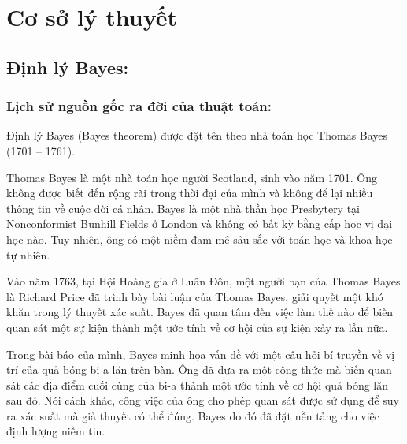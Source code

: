 \setlength{\headheight}{14.93912pt}  %
\addtolength{\topmargin}{-2.93912pt} %

\pagestyle{fancy} 

\fancyhf{}  %

\fancyfoot[C]{\thepage}  %

\chapter[Cơ sở lý thuyết]{\centering Cơ sở lý thuyết}

\section{Định lý Bayes:}

\subsection{Lịch sử nguồn gốc ra đời của thuật toán:}

Định lý Bayes (Bayes theorem) được đặt tên theo nhà toán học Thomas Bayes (1701 – 1761).

Thomas Bayes là một nhà toán học người Scotland, sinh vào năm 1701. Ông không được biết đến rộng rãi trong thời đại của mình và không để lại nhiều thông tin về cuộc đời cá nhân. Bayes là một nhà thần học Presbytery tại Nonconformist Bunhill Fields ở London và không có bất kỳ bằng cấp học vị đại học nào. Tuy nhiên, ông có một niềm đam mê sâu sắc với toán học và khoa học tự nhiên.

Vào năm 1763, tại Hội Hoàng gia ở Luân Đôn, một người bạn của Thomas Bayes là Richard Price đã trình bày bài luận của Thomas Bayes, giải quyết một khó khăn trong lý thuyết xác suất. Bayes đã quan tâm đến việc làm thế nào để biến quan sát một sự kiện thành một ước tính về cơ hội của sự kiện xảy ra lần nữa.

Trong bài báo của mình, Bayes minh họa vấn đề với một câu hỏi bí truyền về vị trí của quả bóng bi-a lăn trên bàn. Ông đã đưa ra một công thức mà biến quan sát các địa điểm cuối cùng của bi-a thành một ước tính về cơ hội quả bóng lăn sau đó. Nói cách khác, công việc của ông cho phép quan sát được sử dụng để suy ra xác suất mà giả thuyết có thể đúng. Bayes do đó đã đặt nền tảng cho việc định lượng niềm tin.

